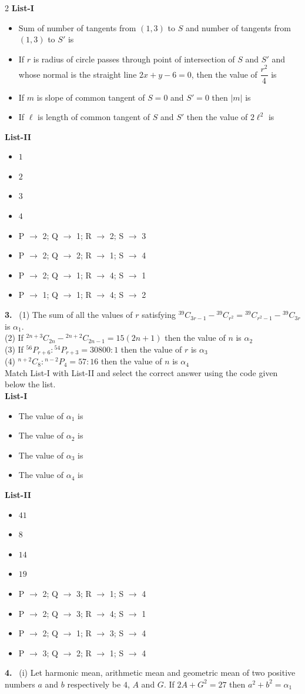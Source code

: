 \documentclass[10pt]{extarticle}
\newcommand{\qn}[1]{\par\smallskip\noindent\textbf{#1.}~}
\newenvironment{qoptions}{\begin{itemize}[leftmargin=1.8em,itemsep=1pt,topsep=2pt,label={}]}{\end{itemize}}
\newcommand{\opt}[2]{\item[(#1)] #2}
\begin{document}
\begin{multicols}{2}
\textbf{List-I}
\begin{qoptions}
\opt{P}{Sum of number of tangents from $(1,3)$ to $S$ and number of tangents from $(1,3)$ to $S'$ is}
\opt{Q}{If $r$ is radius of circle passes through point of intersection of $S$ and $S'$ and whose normal is the straight line $2x+y-6=0$, then the value of $\dfrac{r^2}{4}$ is}
\opt{R}{If $m$ is slope of common tangent of $S=0$ and $S'=0$ then $|m|$ is}
\opt{S}{If $\ell$ is length of common tangent of $S$ and $S'$ then the value of $2\ell^2$ is}
\end{qoptions}
\noindent\textbf{List-II}
\begin{qoptions}
\opt{1}{$1$}
\opt{2}{$2$}
\opt{3}{$3$}
\opt{4}{$4$}
\end{qoptions}
\begin{qoptions}
\opt{A}{P $\to$ 2; Q $\to$ 1; R $\to$ 2; S $\to$ 3}
\opt{B}{P $\to$ 2; Q $\to$ 2; R $\to$ 1; S $\to$ 4}
\opt{C}{P $\to$ 2; Q $\to$ 1; R $\to$ 4; S $\to$ 1}
\opt{D}{P $\to$ 1; Q $\to$ 1; R $\to$ 4; S $\to$ 2}
\end{qoptions}
\qn{3} (1) The sum of all the values of $r$ satisfying ${}^{39}C_{3r-1}-{}^{39}C_{r^2}={}^{39}C_{r^2-1}-{}^{39}C_{3r}$ is $\alpha_1$.\\
(2) If ${}^{2n+3}C_{2n}-{}^{2n+2}C_{2n-1}=15(2n+1)$ then the value of $n$ is $\alpha_2$\\
(3) If ${}^{56}P_{r+6}:{}^{54}P_{r+3}=30800:1$ then the value of $r$ is $\alpha_3$\\
(4) ${}^{n+2}C_8:{}^{n-2}P_4=57:16$ then the value of $n$ is $\alpha_4$\\
Match List-I with List-II and select the correct answer using the code given below the list.\\
\textbf{List-I}
\begin{qoptions}
\opt{P}{The value of $\alpha_1$ is}
\opt{Q}{The value of $\alpha_2$ is}
\opt{R}{The value of $\alpha_3$ is}
\opt{S}{The value of $\alpha_4$ is}
\end{qoptions}
\noindent\textbf{List-II}
\begin{qoptions}
\opt{1}{$41$}
\opt{2}{$8$}
\opt{3}{$14$}
\opt{4}{$19$}
\end{qoptions}
\begin{qoptions}
\opt{A}{P $\to$ 2; Q $\to$ 3; R $\to$ 1; S $\to$ 4}
\opt{B}{P $\to$ 2; Q $\to$ 3; R $\to$ 4; S $\to$ 1}
\opt{C}{P $\to$ 2; Q $\to$ 1; R $\to$ 3; S $\to$ 4}
\opt{D}{P $\to$ 3; Q $\to$ 2; R $\to$ 1; S $\to$ 4}
\end{qoptions}
\qn{4} (i) Let harmonic mean, arithmetic mean and geometric mean of two positive numbers $a$ and $b$ respectively be $4$, $A$ and $G$. If $2A+G^2=27$ then $a^2+b^2=\alpha_1$\\

\end{multicols}
\end{document}
